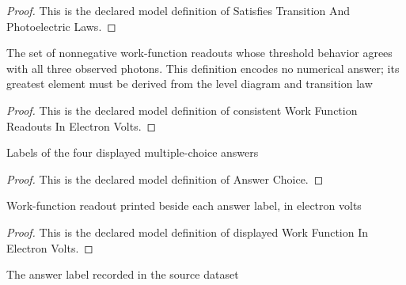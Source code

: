 \begin{proof}
  This is the declared model definition of Satisfies Transition And Photoelectric Laws.
\end{proof}
\begin{definition}
  \label{def:physics:phyx-mini-0518:phyxminiproblems-problemphyxmini0518-consistentworkfunctionreadoutsinelectronvolts}
  The set of nonnegative work-function readouts whose threshold behavior agrees with all three observed photons. This definition encodes no numerical answer; its greatest element must be derived from the level diagram and transition law
\end{definition}
\begin{proof}
  This is the declared model definition of consistent Work Function Readouts In Electron Volts.
\end{proof}
\begin{definition}
  \label{def:physics:phyx-mini-0518:phyxminiproblems-problemphyxmini0518-answerchoice}
  Labels of the four displayed multiple-choice answers
\end{definition}
\begin{proof}
  This is the declared model definition of Answer Choice.
\end{proof}
\begin{definition}
  \label{def:physics:phyx-mini-0518:phyxminiproblems-problemphyxmini0518-displayedworkfunctioninelectronvolts}
  Work-function readout printed beside each answer label, in electron volts
\end{definition}
\begin{proof}
  This is the declared model definition of displayed Work Function In Electron Volts.
\end{proof}
\begin{definition}
  \label{def:physics:phyx-mini-0518:phyxminiproblems-problemphyxmini0518-recordeddatasetanswer}
  The answer label recorded in the source dataset
\end{definition}
